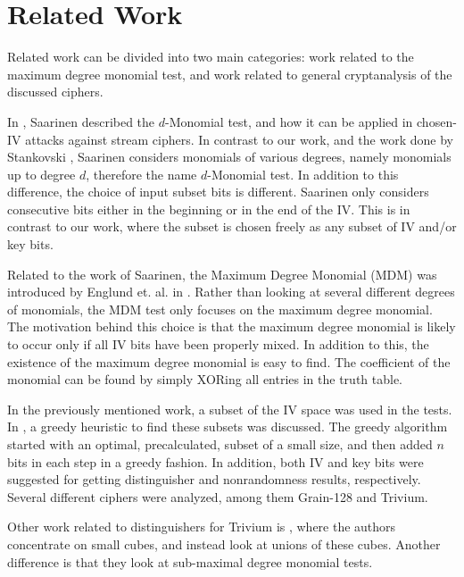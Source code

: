 {\section{Related Work} \label{sec:slightlygreedy:relatedwork}

Related work can be divided into two main categories: work related to the maximum degree monomial test, and work related to general cryptanalysis of the discussed ciphers. 

In \cite{saarinen:2006}, Saarinen described the $d$-Monomial test, and how it can be applied in chosen-IV attacks against stream ciphers. In contrast to our work, and the work done by Stankovski \cite{stankovski:2010}, Saarinen considers monomials of various degrees, namely monomials up to degree $d$, therefore the name $d$-Monomial test. In addition to this difference, the choice of input subset bits is different. Saarinen only considers consecutive bits either in the beginning or in the end of the IV. This is in contrast to our work, where the subset is chosen freely as any subset of IV and/or key bits.

Related to the work of Saarinen, the Maximum Degree Monomial (MDM) was introduced by Englund et. al. in \cite{englund:2007}. Rather than looking at several different degrees of monomials, the MDM test only focuses on the maximum degree monomial. The motivation behind this choice is that the maximum degree monomial is likely to occur only if all IV bits have been properly mixed. In addition to this, the existence of the maximum degree monomial is easy to find. The coefficient of the monomial can be found by simply XORing all entries in the truth table.

In the previously mentioned work, a subset of the IV space was used in the tests. In \cite{stankovski:2010}, a greedy heuristic to find these subsets was discussed. The greedy algorithm started with an optimal, precalculated, subset of a small size, and then added $n$ bits in each step in a greedy fashion. In addition, both IV and key bits were suggested for getting distinguisher and nonrandomness results, respectively. Several different ciphers were analyzed, among them Grain-128 and Trivium.

Other work related to distinguishers for Trivium is \cite{liu:2015}, where the authors concentrate on small cubes, and instead look at unions of these cubes. Another difference is that they look at sub-maximal degree monomial tests.

}

